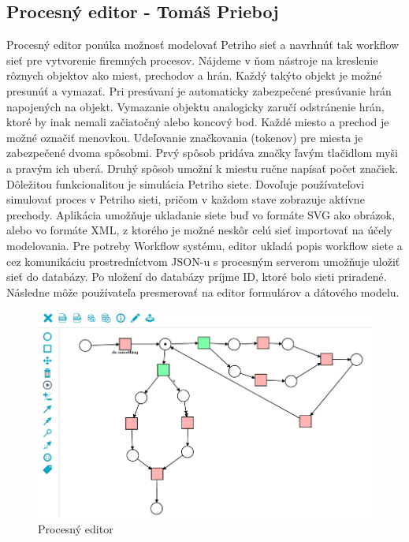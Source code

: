 \subsection{Procesný editor - Tomáš Prieboj}
Procesný editor ponúka možnosť modelovať Petriho sieť a navrhnúť tak workflow sieť pre vytvorenie firemných procesov. Nájdeme v ňom nástroje na kreslenie rôznych objektov ako miest, prechodov a hrán. Každý takýto objekt je možné presunúť a vymazať. Pri presúvaní je automaticky zabezpečené presúvanie hrán napojených na objekt. Vymazanie objektu analogicky zaručí odstránenie hrán, ktoré by inak nemali začiatočný alebo koncový bod. Každé miesto a prechod je možné označiť menovkou. Udeľovanie značkovania (tokenov) pre miesta je zabezpečené dvoma spôsobmi. Prvý spôsob pridáva značky ľavým tlačidlom myši a  pravým ich uberá. Druhý spôsob umožní k miestu ručne napísať počet značiek. Dôležitou funkcionalitou je simulácia Petriho siete. Dovoľuje používateľovi simulovať proces v Petriho sieti, pričom v každom stave zobrazuje aktívne prechody. Aplikácia umožňuje ukladanie siete buď vo formáte SVG ako obrázok, alebo vo formáte XML, z ktorého je možné neskôr celú sieť importovať na účely modelovania. Pre potreby Workflow systému, editor ukladá popis workflow siete a cez komunikáciu prostredníctvom JSON-u s procesným serverom umožňuje uložiť sieť do databázy. Po uložení do databázy príjme ID, ktoré bolo sieti priradené. Následne môže používateľa presmerovať na editor formulárov a dátového modelu.

\begin{figure}[h]
	\centering
	\includegraphics[width=0.7\linewidth]{images/tomas}
	\caption{Procesný editor}
	\label{fig:Procesný editor}
\end{figure}


